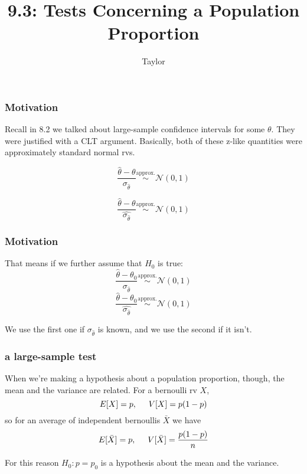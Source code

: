 \documentclass{beamer}
\title["9.3"]{9.3: Tests Concerning a Population Proportion}
\author{Taylor}
\institute[UVA] 
{
University of Virginia \\
\medskip
\textit{} 
}
\date{}
\begin{document}

\begin{frame}
\titlepage 
\end{frame}

\begin{frame}
\frametitle{Motivation}

Recall in 8.2 we talked about large-sample confidence intervals for some $\theta$. They were justified with a CLT argument. Basically, both of these z-like quantities were approximately standard normal rvs.

\[
 \frac{\hat{\theta} - \theta}{\sigma_{\hat{\theta} }} \overset{\text{approx.}}{\sim} \mathcal{N}(0,1)
\]

\[
\frac{\hat{\theta} - \theta}{\widehat{\sigma_{\hat{\theta}}}} \overset{\text{approx.}}{\sim} \mathcal{N}(0,1)
\]

\end{frame}


\begin{frame}
\frametitle{Motivation}

That means if we further assume that $H_0$ is true:
\[
\frac{\hat{\theta} - \theta_0}{\sigma_{\hat{\theta} }} \overset{\text{approx.}}{\sim} \mathcal{N}(0,1)
\]
\[
\frac{\hat{\theta} - \theta_0}{\widehat{\sigma_{\hat{\theta}}}} \overset{\text{approx.}}{\sim} \mathcal{N}(0,1)
\]

We use the first one if $\sigma_{\hat{\theta} }$ is known, and we use the second if it isn't.
\end{frame}


\begin{frame}
\frametitle{a large-sample test}

When we're making a hypothesis about a population proportion, though, the mean and the variance are related. For a bernoulli rv $X$, 
\[
E[X] = p, \hspace{5mm} V[X] = p(1-p)
\]
so for an average of independent bernoullis $\bar{X}$ we have
\[
E[\bar{X}] = p, \hspace{5mm} V[\bar{X}] = \frac{p(1-p)}{n}
\]

For this reason $H_0: p = p_0$ is a hypothesis about the mean and the variance.
\end{frame}
\end{document}
